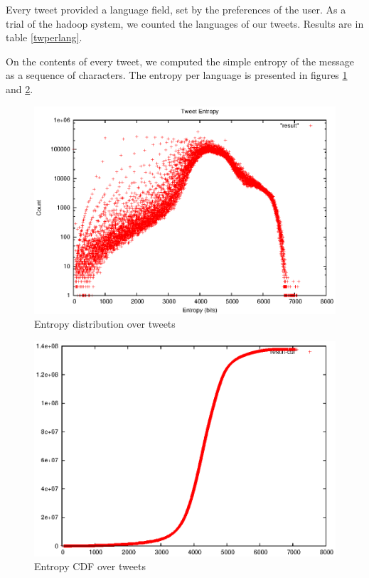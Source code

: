 \documentclass[a4paper,11pt]{article}
\begin{document}
Every tweet provided a language field, set by the preferences of the user. As a trial of the hadoop system, we counted the languages of our tweets. Results are in table \ref{twperlang}.

On the contents of every tweet, we computed the simple entropy of the message as a sequence of characters. The entropy per language is presented in figures \ref{entropy} and \ref{entropycdf}.

\begin{figure}
\centering
\includegraphics[scale=0.5]{text-entropy/result.eps}
\caption{Entropy distribution over tweets}
\label{entropy}
\end{figure}

\begin{figure}
\centering
\includegraphics[scale=0.5]{text-entropy/result-cdf.eps}
\caption{Entropy CDF over tweets}
\label{entropycdf}
\end{figure}
\end{document}
